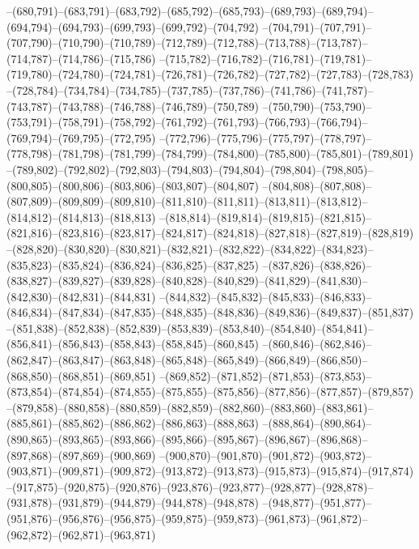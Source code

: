 --(680,791)--(683,791)--(683,792)--(685,792)--(685,793)--(689,793)--(689,794)--(694,794)--(694,793)--(699,793)--(699,792)--(704,792)
--(704,791)--(707,791)--(707,790)--(710,790)--(710,789)--(712,789)--(712,788)--(713,788)--(713,787)--(714,787)--(714,786)--(715,786)
--(715,782)--(716,782)--(716,781)--(719,781)--(719,780)--(724,780)--(724,781)--(726,781)--(726,782)--(727,782)--(727,783)--(728,783)
--(728,784)--(734,784)--(734,785)--(737,785)--(737,786)--(741,786)--(741,787)--(743,787)--(743,788)--(746,788)--(746,789)--(750,789)
--(750,790)--(753,790)--(753,791)--(758,791)--(758,792)--(761,792)--(761,793)--(766,793)--(766,794)--(769,794)--(769,795)--(772,795)
--(772,796)--(775,796)--(775,797)--(778,797)--(778,798)--(781,798)--(781,799)--(784,799)--(784,800)--(785,800)--(785,801)--(789,801)
--(789,802)--(792,802)--(792,803)--(794,803)--(794,804)--(798,804)--(798,805)--(800,805)--(800,806)--(803,806)--(803,807)--(804,807)
--(804,808)--(807,808)--(807,809)--(809,809)--(809,810)--(811,810)--(811,811)--(813,811)--(813,812)--(814,812)--(814,813)--(818,813)
--(818,814)--(819,814)--(819,815)--(821,815)--(821,816)--(823,816)--(823,817)--(824,817)--(824,818)--(827,818)--(827,819)--(828,819)
--(828,820)--(830,820)--(830,821)--(832,821)--(832,822)--(834,822)--(834,823)--(835,823)--(835,824)--(836,824)--(836,825)--(837,825)
--(837,826)--(838,826)--(838,827)--(839,827)--(839,828)--(840,828)--(840,829)--(841,829)--(841,830)--(842,830)--(842,831)--(844,831)
--(844,832)--(845,832)--(845,833)--(846,833)--(846,834)--(847,834)--(847,835)--(848,835)--(848,836)--(849,836)--(849,837)--(851,837)
--(851,838)--(852,838)--(852,839)--(853,839)--(853,840)--(854,840)--(854,841)--(856,841)--(856,843)--(858,843)--(858,845)--(860,845)
--(860,846)--(862,846)--(862,847)--(863,847)--(863,848)--(865,848)--(865,849)--(866,849)--(866,850)--(868,850)--(868,851)--(869,851)
--(869,852)--(871,852)--(871,853)--(873,853)--(873,854)--(874,854)--(874,855)--(875,855)--(875,856)--(877,856)--(877,857)--(879,857)
--(879,858)--(880,858)--(880,859)--(882,859)--(882,860)--(883,860)--(883,861)--(885,861)--(885,862)--(886,862)--(886,863)--(888,863)
--(888,864)--(890,864)--(890,865)--(893,865)--(893,866)--(895,866)--(895,867)--(896,867)--(896,868)--(897,868)--(897,869)--(900,869)
--(900,870)--(901,870)--(901,872)--(903,872)--(903,871)--(909,871)--(909,872)--(913,872)--(913,873)--(915,873)--(915,874)--(917,874)
--(917,875)--(920,875)--(920,876)--(923,876)--(923,877)--(928,877)--(928,878)--(931,878)--(931,879)--(944,879)--(944,878)--(948,878)
--(948,877)--(951,877)--(951,876)--(956,876)--(956,875)--(959,875)--(959,873)--(961,873)--(961,872)--(962,872)--(962,871)--(963,871)
